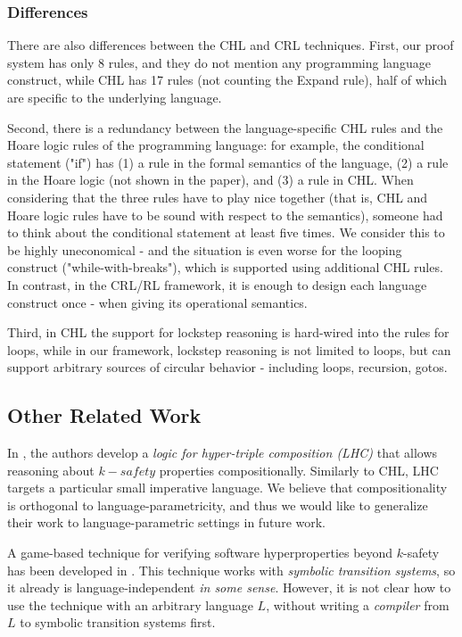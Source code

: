 \subsubsection{Differences}
There are also differences between the CHL and CRL techniques.
First, our proof system has only 8 rules, and they do not mention any programming language construct,
while CHL has 17 rules (not counting the Expand rule), half of which are specific to the underlying language.

Second, there is a redundancy between the language-specific CHL rules and the Hoare logic rules of the
programming language: for example, the conditional statement ("if") has (1) a rule in the formal semantics of the language,
(2) a rule in the Hoare logic (not shown in the paper), and (3) a rule in CHL.
When considering that the three rules have to play nice together (that is, CHL and Hoare logic rules have to be sound with respect to the semantics), someone had to think about the conditional statement at least five times.
We consider this to be highly uneconomical
- and the situation
is even worse for the looping construct ("while-with-breaks"), which is supported using additional CHL rules.
In contrast, in the CRL/RL framework, it is enough to design each language construct once - when giving
its operational semantics.


Third, in CHL the support for lockstep reasoning is hard-wired into the rules for loops,
while in our framework, lockstep reasoning is not limited to loops, but can support arbitrary sources
of circular behavior - including loops, recursion, gotos.

\subsection{Other Related Work}

In \cite{DOsualdoFD22}, the authors develop a \emph{logic for hyper-triple composition (LHC)}
that allows reasoning about $k-safety$ properties compositionally.
Similarly to CHL, LHC targets a particular small imperative language.
We believe that compositionality is orthogonal to language-parametricity,
and thus we would like to generalize their work to language-parametric settings in future work.

A game-based technique for verifying software hyperproperties beyond $k$-safety
has been developed in \cite{BeutnerF22}.
This technique works with \emph{symbolic transition systems},
so it already is language-independent \emph{in some sense}. However, it is not clear how to use the technique
with an arbitrary language $L$, without writing a \emph{compiler} from $L$ to symbolic transition systems first.
